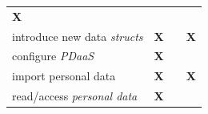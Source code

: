 \documentclass[12pt,english,a4paper,titlepage,cleardoublepage=empty,dottedtoc]{report}
\begin{document}
\begin{longtable}[]{@{}lccc@{}}
\begin{minipage}[t]{0.24\columnwidth}
\textbf{X}\strut
\end{minipage}\tabularnewline
\begin{minipage}[t]{0.24\columnwidth}\raggedright\strut
introduce new data \emph{structs}\strut
\end{minipage} & \begin{minipage}[t]{0.24\columnwidth}\centering\strut
\textbf{X}\strut
\end{minipage} & \begin{minipage}[t]{0.24\columnwidth}\centering\strut
\strut
\end{minipage} & \begin{minipage}[t]{0.24\columnwidth}\centering\strut
\textbf{X}\strut
\end{minipage}\tabularnewline
\begin{minipage}[t]{0.24\columnwidth}\raggedright\strut
configure \emph{PDaaS}\strut
\end{minipage} & \begin{minipage}[t]{0.24\columnwidth}\centering\strut
\textbf{X}\strut
\end{minipage} & \begin{minipage}[t]{0.24\columnwidth}\centering\strut
\strut
\end{minipage} & \begin{minipage}[t]{0.24\columnwidth}\centering\strut
\strut
\end{minipage}\tabularnewline
\begin{minipage}[t]{0.24\columnwidth}\raggedright\strut
import personal data\strut
\end{minipage} & \begin{minipage}[t]{0.24\columnwidth}\centering\strut
\textbf{X}\strut
\end{minipage} & \begin{minipage}[t]{0.24\columnwidth}\centering\strut
\strut
\end{minipage} & \begin{minipage}[t]{0.24\columnwidth}\centering\strut
\textbf{X}\strut
\end{minipage}\tabularnewline
\begin{minipage}[t]{0.36\columnwidth}\raggedright\strut
read/access \emph{personal data}\strut
\end{minipage} & \begin{minipage}[t]{0.12\columnwidth}\centering\strut
\textbf{X}\strut
\end{minipage} & \begin{minipage}[t]{0.12\columnwidth}\centering\strut

\end{minipage}
\end{longtable}
\end{document}
